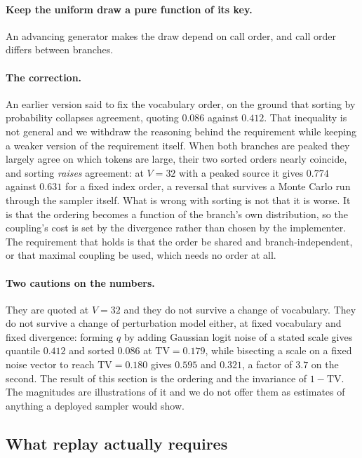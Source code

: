 \documentclass[11pt]{article}
\theoremstyle{remark}
\newcommand{\TV}{\mathrm{TV}}
\begin{document}
\paragraph{Keep the uniform draw a pure function of its key.} An advancing
generator makes the draw depend on call order, and call order differs between
branches.

\paragraph{The correction.} An earlier version said to fix the vocabulary order,
on the ground that sorting by probability collapses agreement, quoting $0.086$
against $0.412$. That inequality is not general and we withdraw the reasoning
behind the requirement while keeping a weaker version of the requirement itself.
When both branches are peaked they largely agree on which tokens are large, their
two sorted orders nearly coincide, and sorting \emph{raises} agreement: at
$V = 32$ with a peaked source it gives $0.774$ against $0.631$ for a fixed index
order, a reversal that survives a Monte Carlo run through the sampler itself.
What is wrong with sorting is not that it is worse. It is that the ordering
becomes a function of the branch's own distribution, so the coupling's cost is
set by the divergence rather than chosen by the implementer. The requirement that
holds is that the order be shared and branch-independent, or that maximal
coupling be used, which needs no order at all.

\paragraph{Two cautions on the numbers.} They are quoted at $V = 32$ and they do
not survive a change of vocabulary. They do not survive a change of perturbation
model either, at fixed vocabulary and fixed divergence: forming $q$ by adding
Gaussian logit noise of a stated scale gives quantile $0.412$ and sorted $0.086$
at $\TV = 0.179$, while bisecting a scale on a fixed noise vector to reach
$\TV = 0.180$ gives $0.595$ and $0.321$, a factor of $3.7$ on the second. The
result of this section is the ordering and the invariance of $1 - \TV$. The
magnitudes are illustrations of it and we do not offer them as estimates of
anything a deployed sampler would show.

\subsection{What replay actually requires}
\end{document}
